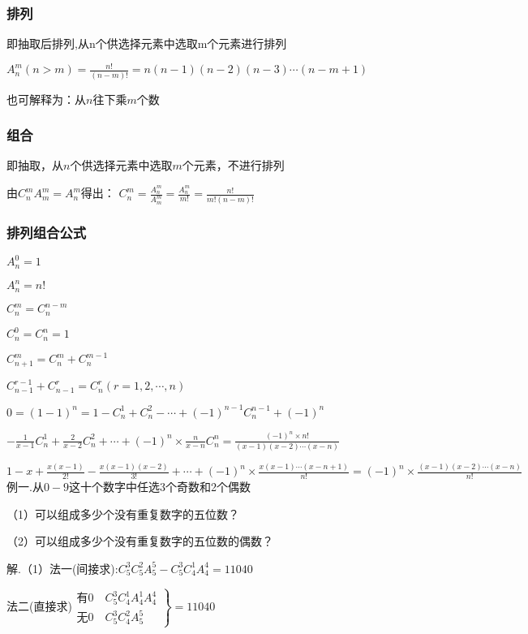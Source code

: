 \documentclass[UTF8]{ctexart}
\begin{document}
\subsubsection{排列}

即抽取后排列,从n个供选择元素中选取m个元素进行排列

$A_{n}^{m} (n> m)=\frac{n!}{(n-m)!}=n(n-1)(n-2)(n-3)\cdots(n-m+1)$

也可解释为：从$n$往下乘$m$个数

\subsubsection{组合}

即抽取，从$n$个供选择元素中选取$m$个元素，不进行排列

由$C_{n}^{m} A_{m}^{m} =A_{n}^{m}$得出：
$C_{n}^{m} =\frac{A_{n}^{m} }{A_{m}^{m} } =\frac{A_{n}^{m} }{m!}=\frac{n!}{m!(n-m)!} $

\subsubsection{排列组合公式}

$A_{n}^{0} =1$

$A_{n}^{n} =n!$

$C_{n}^{m} =C_{n}^{n-m} $

$C_{n}^{0} =C_{n}^{n} =1$

$C_{n+1}^{m} =C_{n}^{m} +C_{n}^{m-1} $

$C_{n-1}^{r-1} +C_{n-1}^{r} =C_{n}^{r} (r=1,2,\cdots ,n)$

$0=(1-1)^n=1-C_{n}^{1} +C_{n}^{2} -\cdots +(-1)^{n-1}C_{n}^{n-1}+(-1)^n$

$-\frac{1}{x-1} C_{n}^{1} +\frac{2}{x-2} C_{n}^{2} +\cdots +(-1)^n\times \frac{n}{x-n}
C_{n}^{n}=\frac{(-1)^n\times n!}{(x-1)(x-2)\cdots (x-n)} $

$1-x+\frac{x(x-1)}{2!} -\frac{x(x-1)(x-2)}{3!} +\cdots +(-1)^n\times \frac{x(x-1)\cdots
(x-n+1)}{n!}=(-1)^n\times \frac{(x-1)(x-2)\cdots (x-n)}{n!}$
\\

例一.从$0-9$这十个数字中任选3个奇数和2个偶数

（1）可以组成多少个没有重复数字的五位数？

（2）可以组成多少个没有重复数字的五位数的偶数？

解.（1）法一(间接求):$C_{5}^{3} C_{5}^{2} A_{5}^{5} -C_{5}^{3} C_{4}^{1} A_{4}^{4}=11040$

法二(直接求)$\left.\begin{matrix} \text{有}0 \quad C_{5}^{3} C_{4}^{1} A_{4}^{1}A_{4}^{4}  
\\\text{无}0 \quad C_{5}^{3} C_{4}^{2} A_{5}^{5} 
\end{matrix}\right\}=11040$
\end{document}
